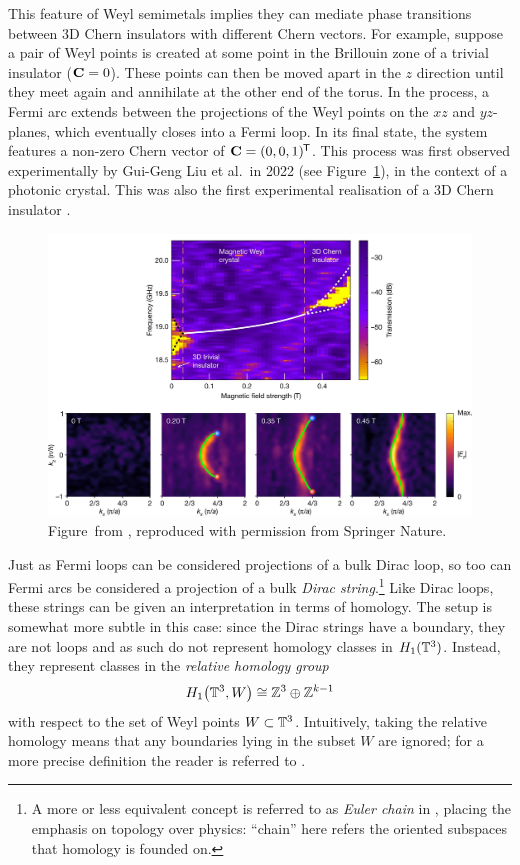 This feature of Weyl semimetals implies they can mediate phase transitions between 3D Chern insulators with different Chern vectors. For example, suppose a pair of Weyl points is created at some point in the Brillouin zone of a trivial insulator ($\vb{C}=0$). These points can then be moved apart in the $z$ direction until they meet again and annihilate at the other end of the torus. In the process, a Fermi arc extends between the projections of the Weyl points on the $xz$ and $yz$-planes, which eventually closes into a Fermi loop. In its final state, the system features a non-zero Chern vector of $\vb{C} = (0,0,1)^{\mkern-1.5mu\mathsf{T}}$. This process was first observed experimentally by Gui-Geng Liu et al.\ in 2022 (see Figure~\ref{fig:Weyl-phase-transition}), in the context of a photonic crystal. This was also the first experimental realisation of a 3D Chern insulator \cite{Liu_photonic-Chern-vector}.
\begin{figure}[htb!]
	\centering
	\includegraphics[width=\linewidth]{Images/Weyl-phase-transition}
	\caption{
		Figure~from \cite{Liu_photonic-Chern-vector}, reproduced with permission from Springer Nature.}
	\label{fig:Weyl-phase-transition}
\end{figure}

Just as Fermi loops can be considered projections of a bulk Dirac loop, so too can Fermi arcs be considered a projection of a bulk \emph{Dirac string}.\footnote{
	A more or less equivalent concept is referred to as \emph{Euler chain} in \cite{Mathai_math-review}, placing the emphasis on topology over physics: ``chain'' here refers the oriented subspaces that homology is founded on.}
Like Dirac loops, these strings can be given an interpretation in terms of homology. The setup is somewhat more subtle in this case: since the Dirac strings have a boundary, they are not loops and as such do not represent homology classes in $H_1(\mathbb{T}^3)$. Instead, they represent classes in the \emph{relative homology group}
\begin{equation}
	H_1\big(\mathbb{T}^3, W\big) \cong \mathbb{Z}^3\oplus\mathbb{Z}^{k-1}
\end{equation}
with respect to the set of Weyl points $W\subset\mathbb{T}^3$. Intuitively, taking the relative homology means that any boundaries lying in the subset $W$ are ignored; for a more precise definition the reader is referred to \parencite[\S 2.1]{Hatcher_algebraic-topology}.

